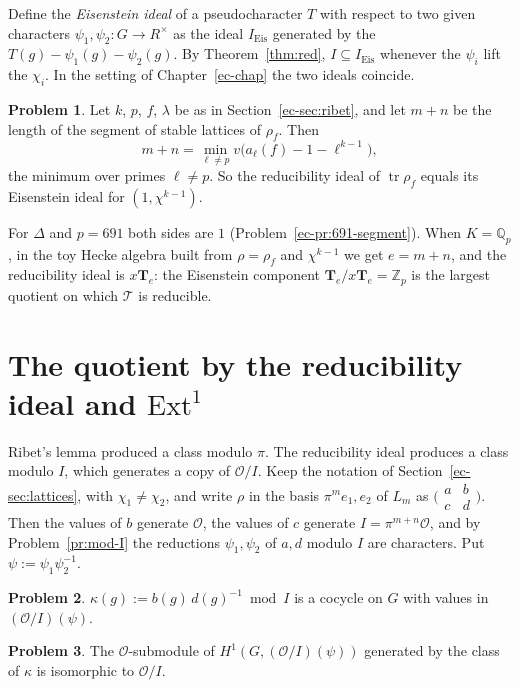\documentclass[reqno]{amsart}
\newcounter{chap}
\theoremstyle{definition}
\newtheorem{problem}{Problem}[section]
\theoremstyle{plain}
\newcommand{\Z}{\mathbb{Z}}
\newcommand{\Q}{\mathbb{Q}}
\newcommand{\Zp}{\Z_p}
\newcommand{\Qp}{\Q_p}
\newcommand{\Oc}{\mathcal{O}}
\newcommand{\Tb}{\mathbf{T}}
\newcommand{\tr}{\operatorname{tr}}
\newcommand{\Eis}{\mathrm{Eis}}
\newcommand{\mat}[4]{\bigl(\begin{smallmatrix} #1 & #2 \\ #3 & #4 \end{smallmatrix}\bigr)}
\begin{document}
Define the \emph{Eisenstein ideal} of a pseudocharacter \(T\) with respect to two given characters \(\psi_1, \psi_2 \colon G \to R^\times\) as the ideal \(I_\Eis\) generated by the \(T(g) - \psi_1(g) - \psi_2(g)\).  By Theorem~\ref{thm:red}, \(I \subseteq I_\Eis\) whenever the \(\psi_i\) lift the \(\chi_i\).  In the setting of Chapter~\ref{ec-chap} the two ideals coincide.

\begin{problem}\label{pr:seg-eis}
Let \(k\), \(p\), \(f\), \(\lambda\) be as in Section~\ref{ec-sec:ribet}, and let \(m + n\) be the length of the segment of stable lattices of \(\rho_f\).  Then
\[
  m + n = \min_{\ell \ne p} v\bigl(a_\ell(f) - 1 - \ell^{k-1}\bigr) ,
\]
the minimum over primes \(\ell \ne p\).  So the reducibility ideal of \(\tr\rho_f\) equals its Eisenstein ideal for \((1, \chi^{k-1})\).
\end{problem}

For \(\Delta\) and \(p = 691\) both sides are \(1\) (Problem~\ref{ec-pr:691-segment}).  When \(K = \Qp\), in the toy Hecke algebra built from \(\rho = \rho_f\) and \(\chi^{k-1}\) we get \(e = m + n\), and the reducibility ideal is \(x\Tb_e\): the Eisenstein component \(\Tb_e/x\Tb_e = \Zp\) is the largest quotient on which \(\mathcal{T}\) is reducible.

\section{The quotient by the reducibility ideal and \texorpdfstring{\(\mathrm{Ext}^1\)}{Ext1}}\label{sec:ext}

Ribet's lemma produced a class modulo \(\pi\).  The reducibility ideal produces a class modulo \(I\), which generates a copy of \(\Oc/I\).  Keep the notation of Section~\ref{ec-sec:lattices}, with \(\chi_1 \ne \chi_2\), and write \(\rho\) in the basis \(\pi^m e_1, e_2\) of \(L_m\) as \(\mat{a}{b}{c}{d}\).  Then the values of \(b\) generate \(\Oc\), the values of \(c\) generate \(I = \pi^{m+n}\Oc\), and by Problem~\ref{pr:mod-I} the reductions \(\psi_1, \psi_2\) of \(a, d\) modulo \(I\) are characters.  Put \(\psi := \psi_1\psi_2^{-1}\).

\begin{problem}\label{pr:cocycle}
\(\kappa(g) := b(g)\,d(g)^{-1} \bmod I\) is a cocycle on \(G\) with values in \((\Oc/I)(\psi)\).
\end{problem}

\begin{problem}\label{pr:exact-order}
The \(\Oc\)-submodule of \(H^1(G, (\Oc/I)(\psi))\) generated by the class of \(\kappa\) is isomorphic to \(\Oc/I\).
\end{problem}
\end{document}
